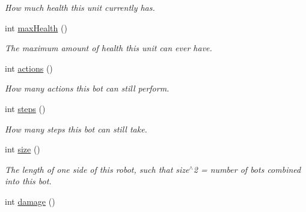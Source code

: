 \begin{DoxyCompactItemize}
\begin{DoxyCompactList}\small\item\em How much health this unit currently has. \item\end{DoxyCompactList}\item 
\hypertarget{classBot_a5da61adb4275e225cf2293a91701cac2}{
int \hyperlink{classBot_a5da61adb4275e225cf2293a91701cac2}{maxHealth} ()}
\label{classBot_a5da61adb4275e225cf2293a91701cac2}

\begin{DoxyCompactList}\small\item\em The maximum amount of health this unit can ever have. \item\end{DoxyCompactList}\item 
\hypertarget{classBot_ac11195160a92b68eb5cce1a5c100395b}{
int \hyperlink{classBot_ac11195160a92b68eb5cce1a5c100395b}{actions} ()}
\label{classBot_ac11195160a92b68eb5cce1a5c100395b}

\begin{DoxyCompactList}\small\item\em How many actions this bot can still perform. \item\end{DoxyCompactList}\item 
\hypertarget{classBot_a9ac3ebfa1429eb945ac0a00ea642ba41}{
int \hyperlink{classBot_a9ac3ebfa1429eb945ac0a00ea642ba41}{steps} ()}
\label{classBot_a9ac3ebfa1429eb945ac0a00ea642ba41}

\begin{DoxyCompactList}\small\item\em How many steps this bot can still take. \item\end{DoxyCompactList}\item 
\hypertarget{classBot_a7231a6a603986259558366bfb59ada0a}{
int \hyperlink{classBot_a7231a6a603986259558366bfb59ada0a}{size} ()}
\label{classBot_a7231a6a603986259558366bfb59ada0a}

\begin{DoxyCompactList}\small\item\em The length of one side of this robot, such that size$^\wedge$2 = number of bots combined into this bot. \item\end{DoxyCompactList}\item 
\hypertarget{classBot_a565185d07dfbc75377c1f97eadb6a871}{
int \hyperlink{classBot_a565185d07dfbc75377c1f97eadb6a871}{damage} ()}
\label{classBot_a565185d07dfbc75377c1f97eadb6a871}


\end{DoxyCompactItemize}
